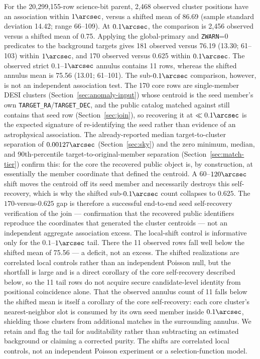 \documentclass[twocolumn,linenumbers]{aastex702}
\begin{document}
For the 20,299,155-row science-bit parent, 2,468 observed cluster positions have an association
within $1\arcsec$, versus a shifted mean of 86.69 (sample standard deviation 14.42; range 66--109).
At $0.1\arcsec$, the comparison is 2,456 observed versus a shifted mean of 0.75.  Applying the
global-primary and \texttt{ZWARN}=0 predicates to the background targets gives 181 observed versus
76.19 (13.30; 61--103) within $1\arcsec$, and 170 observed versus 0.625 within $0.1\arcsec$.
The observed strict $0.1$--$1\arcsec$ annulus contains 11 rows, whereas the shifted annulus mean
is 75.56 (13.01; 61--101).  The sub-$0.1\arcsec$ comparison, however, is not an independent
association test.  The 170 core rows are single-member DESI clusters
(Section~\ref{sec:anomaly-input}) whose centroid is the seed member's own
\texttt{TARGET\_RA}/\texttt{TARGET\_DEC}, and the public catalog matched against still contains
that seed row (Section~\ref{sec:join}), so recovering it at $\ll0.1\arcsec$ is the expected
signature of re-identifying the seed rather than evidence of an astrophysical association.  The
already-reported median target-to-cluster separation of $0.00127\arcsec$
(Section~\ref{sec:sky}) and the zero minimum, median, and 90th-percentile
target-to-original-member separation (Section~\ref{sec:match-tier}) confirm this: for the core the
recovered public object is, by construction, at essentially the member coordinate that defined the
centroid.  A $60$--$120\arcsec$ shift moves the centroid off its seed member and necessarily
destroys this self-recovery, which is why the shifted sub-$0.1\arcsec$ count collapses to $0.625$.
The $170$-versus-$0.625$ gap is therefore a successful end-to-end seed self-recovery verification
of the join --- confirmation that the recovered public identifiers reproduce the coordinates that
generated the cluster centroids --- not an independent aggregate association excess.  The
local-shift control is informative only for the $0.1$--$1\arcsec$ tail.  There the 11 observed
rows fall well below the shifted mean of 75.56 --- a deficit, not an excess.  The shifted
realizations are correlated local controls rather than an independent Poisson null, but the
shortfall is large and is a direct corollary of the core self-recovery described below, so the 11
tail rows do not acquire secure candidate-level identity from positional coincidence alone.  That
the observed annulus count of 11 falls below the shifted mean is itself a corollary of the core
self-recovery: each core cluster's nearest-neighbor slot is consumed by its own seed member inside
$0.1\arcsec$, shielding those clusters from additional matches in the surrounding annulus.  We
retain and flag the tail for
auditability rather than subtracting an estimated background or claiming a corrected purity.  The
shifts are correlated local controls, not an independent Poisson experiment or a
selection-function model.
\end{document}
